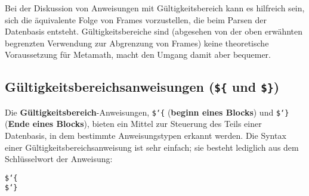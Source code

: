Bei der Diskussion von Anweisungen mit Gültigkeitsbereich kann es hilfreich sein, sich die äquivalente Folge von Frames vorzustellen, die beim Parsen der Datenbasis entsteht.  Gültigkeitsbereiche sind (abgesehen von der oben erwähnten begrenzten Verwendung zur Abgrenzung von Frames) keine theoretische Voraussetzung für Metamath, macht den Umgang damit aber bequemer.

\subsection{Gültigkeitsbereichsanweisungen (\texttt{\$\{} und \texttt{\$\}})}\label{scoping}


Die {\bf Gültigkeitsbereich}-Anweisungen, \texttt{\$\char`\{} ({\bf beginn eines Blocks}) und \texttt{\$\char`\}} ({\bf Ende eines Blocks}), bieten ein Mittel zur Steuerung des Teils einer Datenbasis, in dem bestimmte Anweisungstypen erkannt werden.  Die Syntax einer Gültigkeitsbereichsanweisung ist sehr einfach; sie besteht lediglich aus dem Schlüsselwort der Anweisung: 
\begin{center}
\texttt{\$\char`\{}\\
\texttt{\$\char`\}}
\end{center}

